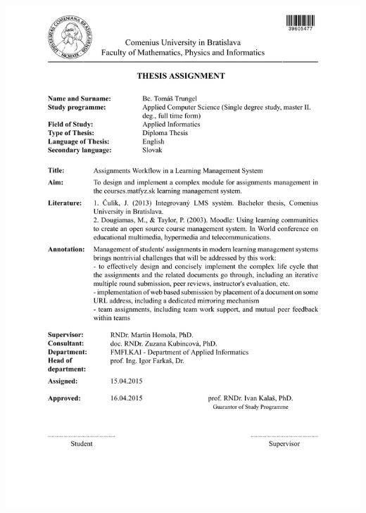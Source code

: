 \documentclass[12pt, oneside]{book}
\begin{document}
\newpage 
\thispagestyle{empty}
\hspace{-2cm}\includegraphics[width=1.1\textwidth]{Tomas_EN.pdf}
\end{document}
